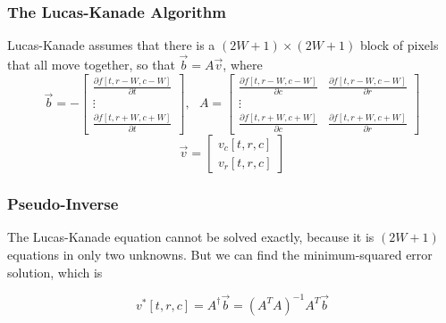 \documentclass{beamer}
\begin{document}
\begin{frame}
  \frametitle{The Lucas-Kanade Algorithm}

  Lucas-Kanade assumes that there is a $(2W+1)\times(2W+1)$ block of
  pixels that all move together, so that $\vec{b}=A\vec{v}$, where
  \[
  \vec{b} = -\left[\begin{array}{c}
      \frac{\partial f[t,r-W,c-W]}{\partial t}\\
      \vdots\\
      \frac{\partial f[t,r+W,c+W]}{\partial t}
    \end{array}\right],~~~
  A=\left[\begin{array}{cc}
      \frac{\partial f[t,r-W,c-W]}{\partial c}&\frac{\partial f[t,r-W,c-W]}{\partial r}\\
      \vdots\\
      \frac{\partial f[t,r+W,c+W]}{\partial c}&\frac{\partial f[t,r+W,c+W]}{\partial r}
    \end{array}\right]
  \]
  \[
  \vec{v}=\left[\begin{array}{c}v_c[t,r,c]\\ v_r[t,r,c]\end{array}\right]
  \]
\end{frame}

\begin{frame}
  \frametitle{Pseudo-Inverse}

  The Lucas-Kanade equation cannot be solved exactly, because it is
  $(2W+1)$ equations in only two unknowns.  But we can find the
  minimum-squared error solution, which is

  \[
  v^*[t,r,c] = A^\dag\vec{b} = (A^TA)^{-1}A^T\vec{b}
  \]
\end{frame}
\end{document}
